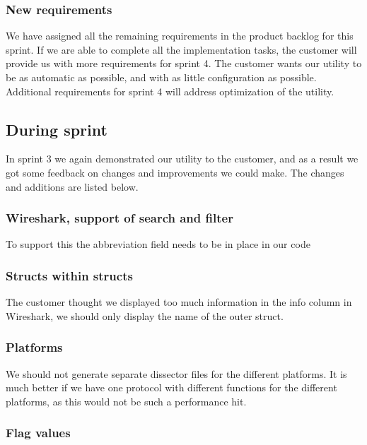 \subsubsection{New requirements}

We have assigned all the remaining requirements in the product backlog for this sprint.
If we are able to complete all the implementation tasks, the customer will provide us with more requirements for sprint 4.
The customer wants our utility to be as automatic as possible, and with as little configuration as possible. 
Additional requirements for sprint 4 will address optimization of the utility.

\subsection{During sprint}

In sprint 3 we again demonstrated our utility to the customer, and as a result we got some feedback on changes
and improvements we could make. The changes and additions are listed below.

\subsubsection{Wireshark, support of search and filter}

To support this the abbreviation field needs to be in place in our code

\subsubsection{Structs within structs}

The customer thought we displayed too much information in the info column in Wireshark,
 we should only display the name of the outer struct.

\subsubsection{Platforms}

We should not generate separate dissector files for the different platforms. It is much better if we have one protocol
with different functions for the different platforms, as this would not be such a performance hit.

\subsubsection{Flag values}

